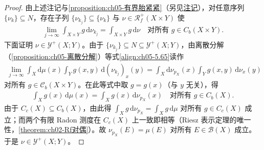 \documentclass[../../main.tex]{subfiles}%
\begin{document}
\begin{proof}
由上述注记与\cref{proposition:ch05-有界胎紧紧}（另见\hyperref[remark:ch05-polish]{注记}），对任意序列 $\{\nu_k\}\subseteq N$，存在子列 $\{\nu_{k_j}\}\subseteq\{\nu_k\}$ 与 $\nu\in\mathscr{R}^+_f(X\times Y)$ 使
\begin{align}
\lim_{j\to\infty}\int_{X\times Y}g\,\mathrm{d}\nu_{k_j}
=\int_{X\times Y}g\,\mathrm{d}\nu
\quad\text{对所有 }g\in C_b(X\times Y).\label{align:ch05-5.65}
\end{align}
下面证明 $\nu\in\mathcal{Y}^+(X;Y)$。由于 $\{\nu_{k_j}\}\subseteq N\subseteq\mathcal{Y}^+(X;Y)$，由离散分解（\cref{proposition:ch05-离散分解}）等式\eqref{align:ch05-5.65}读作
\begin{align*}
\lim_{j\to\infty}\int_X\mathrm{d}\mu(x)\int_Y g(x,y)\,\mathrm{d}(\nu_{k_j})_x(y)
=\int_X\mathrm{d}\nu_{p_X}(x)\int_Y g(x,y)\,\mathrm{d}\nu_x(y)
\end{align*}
对所有 $g\in\mathcal{C}_b(X\times Y)$。在此等式中取 $g=g(x)$（与 $y$ 无关），得
\begin{align*}
\int_X g(x)\,\mathrm{d}\mu(x)=\int_X g(x)\,\mathrm{d}\nu_{p_X}(x)
\quad\text{对所有 }g\in C_b(X).
\end{align*}
由于 $C_c(X)\subseteq C_b(X)$，由此得 $\int_Xg\,\mathrm{d}\nu_{p_X}=\int_Xg\,\mathrm{d}\mu$ 对所有 $g\in C_c(X)$ 成立；而两个有限 Radon 测度在 $C_c(X)$ 上一致即相等（Riesz 表示定理的唯一性，\cref{theorem:ch02-Rf对偶}）。故 $\nu_{p_X}(E)=\mu(E)$ 对所有 $E\in\mathscr{B}(X)$ 成立。于是 $\nu\in\mathcal{Y}^+(X;Y)$。


\end{proof}
\end{document}
